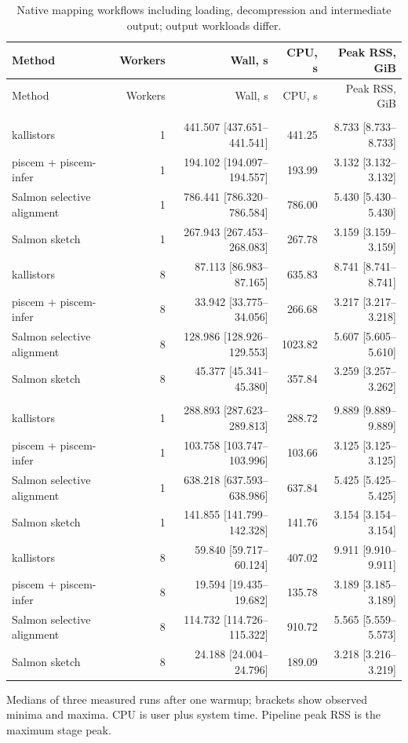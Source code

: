 \begingroup
\small
\setlength{\tabcolsep}{4pt}
\begin{longtable}{@{}lrrrr@{}}
\caption{Native mapping workflows including loading, decompression and intermediate output; output workloads differ.}\label{tab:paper-mapping}\\
\toprule
Method & Workers & Wall, s & CPU, s & Peak RSS, GiB \\
\midrule
\endfirsthead
\toprule
Method & Workers & Wall, s & CPU, s & Peak RSS, GiB \\
\midrule
\endhead
\bottomrule
\endfoot
\addlinespace
\multicolumn{5}{@{}l}{\textit{SRR10919051}} \\
kallistors & 1 & 441.507 [437.651--441.541] & 441.25 & 8.733 [8.733--8.733] \\
piscem + piscem-infer & 1 & 194.102 [194.097--194.557] & 193.99 & 3.132 [3.132--3.132] \\
Salmon selective alignment & 1 & 786.441 [786.320--786.584] & 786.00 & 5.430 [5.430--5.430] \\
Salmon sketch & 1 & 267.943 [267.453--268.083] & 267.78 & 3.159 [3.159--3.159] \\
kallistors & 8 & 87.113 [86.983--87.165] & 635.83 & 8.741 [8.741--8.741] \\
piscem + piscem-infer & 8 & 33.942 [33.775--34.056] & 266.68 & 3.217 [3.217--3.218] \\
Salmon selective alignment & 8 & 128.986 [128.926--129.553] & 1023.82 & 5.607 [5.605--5.610] \\
Salmon sketch & 8 & 45.377 [45.341--45.380] & 357.84 & 3.259 [3.257--3.262] \\
\addlinespace
\multicolumn{5}{@{}l}{\textit{SRR10919051-se}} \\
kallistors & 1 & 288.893 [287.623--289.813] & 288.72 & 9.889 [9.889--9.889] \\
piscem + piscem-infer & 1 & 103.758 [103.747--103.996] & 103.66 & 3.125 [3.125--3.125] \\
Salmon selective alignment & 1 & 638.218 [637.593--638.986] & 637.84 & 5.425 [5.425--5.425] \\
Salmon sketch & 1 & 141.855 [141.799--142.328] & 141.76 & 3.154 [3.154--3.154] \\
kallistors & 8 & 59.840 [59.717--60.124] & 407.02 & 9.911 [9.910--9.911] \\
piscem + piscem-infer & 8 & 19.594 [19.435--19.682] & 135.78 & 3.189 [3.185--3.189] \\
Salmon selective alignment & 8 & 114.732 [114.726--115.322] & 910.72 & 5.565 [5.559--5.573] \\
Salmon sketch & 8 & 24.188 [24.004--24.796] & 189.09 & 3.218 [3.216--3.219] \\
\end{longtable}
\noindent\footnotesize Medians of three measured runs after one warmup; brackets show observed minima and maxima. CPU is user plus system time. Pipeline peak RSS is the maximum stage peak.
\endgroup
